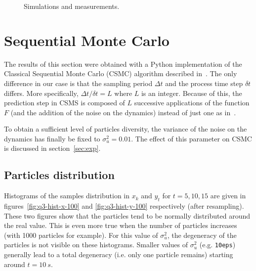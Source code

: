 \documentclass[english, DIV=13]{scrartcl}
\begin{document}
\begin{figure}[hb]
    \caption{Simulations and measurements.}
\end{figure}

\FloatBarrier

\section{Sequential Monte Carlo}
The results of this section were obtained with a Python implementation of the Classical
Sequential Monte Carlo (CSMC) algorithm described in~\cite{anuj}. The only difference
in our case is that the sampling period $\Delta t$ and the process time step $\delta t$
differs. More specifically, $\Delta t/\delta t = L$ where $L$ is an integer. Because
of this, the prediction step in CSMS is composed of $L$ successive applications of the
function $F$ (and the addition of the noise on the dynamics) instead of just one as
in~\cite{anuj}.

To obtain a sufficient level of particles diversity, the variance of the noise on the
dynamics has finally be fixed to $\sigma^2_u = 0.01$. The effect of this parameter on
CSMC is discussed in section~\ref{sec:exp}.

\subsection{Particles distribution}
\label{sec:particles-distri}
Histograms of the samples distribution in $x_k$ and $y_t$ for $t = 5, 10, 15$ are
given in figures~\ref{fig:q3-hist-x-100} and \ref{fig:q3-hist-y-100} respectively
(after resampling). These two figures show that the particles tend to be normally
distributed around the real value. This is even more true when the number of particles
increases (with 1000 particles for example). For this value of $\sigma^2_u$, the degeneracy
of the particles is not visible on these histograms. Smaller values of $\sigma^2_u$ (e.g.
\texttt{10eps}) generally lead to a total degeneracy (i.e. only one particle remains) starting
around $t = \SI{10}{s}$.
\end{document}
